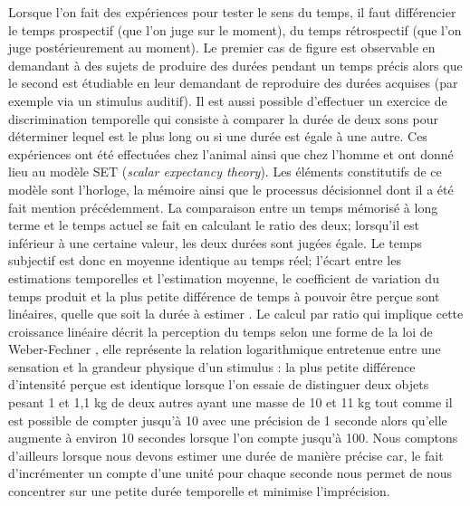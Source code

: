 \documentclass[12pt,fleqn,oneside,openany]{book} %
\begin{document}
Lorsque l'on fait des expériences pour tester le sens du temps, il faut différencier le temps prospectif (que l'on juge sur le moment), du temps rétrospectif (que l'on juge postérieurement au moment). Le premier cas de figure est observable en demandant à des sujets de produire des durées pendant un temps précis alors que le second est étudiable en leur demandant de reproduire des durées acquises (par exemple via un stimulus auditif). Il est aussi possible d'effectuer un exercice de discrimination temporelle qui consiste à comparer la durée de deux sons pour déterminer lequel est le plus long ou si une durée est égale à une autre. Ces expériences ont été effectuées chez l'animal \cite{jasselette} ainsi que chez l'homme \cite{gibbon1984} et ont donné lieu au modèle SET (\emph{scalar expectancy theory}). Les éléments constitutifs de ce modèle sont l'horloge, la mémoire ainsi que le processus décisionnel dont il a été fait mention précédemment. La comparaison entre un temps mémorisé à long terme et le temps actuel se fait en calculant le ratio des deux; lorsqu'il est inférieur à une certaine valeur, les deux durées sont jugées égale. Le temps subjectif est donc en moyenne identique au temps réel; l'écart entre les estimations temporelles et l'estimation moyenne, le coefficient de variation du temps produit et la plus petite différence de temps à pouvoir être perçue sont linéaires, quelle que soit la durée à estimer \cite{set}. Le calcul par ratio qui implique cette croissance linéaire décrit la perception du temps selon une forme de la loi de Weber-Fechner \cite{gibbon1984,wearden1988}, elle représente la relation logarithmique entretenue entre une sensation et la grandeur physique d'un stimulus : la plus petite différence d'intensité perçue est identique lorsque l'on essaie de distinguer deux objets pesant 1 et 1,1 kg de deux autres ayant une masse de 10 et 11 kg \cite{weber} tout comme il est possible de compter jusqu'à 10 avec une précision de 1 seconde alors qu'elle augmente à environ 10 secondes lorsque l'on compte jusqu'à 100. Nous comptons d'ailleurs lorsque nous devons estimer une durée de manière précise car, le fait d'incrémenter un compte d'une unité pour chaque seconde nous permet de nous concentrer sur une petite durée temporelle et minimise l'imprécision.

\begin{figure}[h]
\end{figure}
\end{document}

